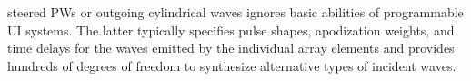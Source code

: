 steered \acp{PW}
\cite{article:OzkanITUFFC2018,article:BessonITUFFC2018,article:BessonITUFFC2016,article:DavidJASA2015,proc:SchiffnerIUS2013a,proc:SchiffnerIUS2013b,article:ZhangUlt2013,proc:SchiffnerIUS2012,article:SchiffnerBMT2012,proc:SchiffnerIUS2011} or
outgoing cylindrical waves
\cite{article:BessonITUFFC2018} ignores
basic abilities of
programmable \ac{UI} systems.
The latter typically specifies
pulse shapes,
apodization weights, and
time delays for
the waves emitted by
the individual array elements and provides
hundreds of
degrees of
freedom to synthesize
alternative types of
incident waves.
